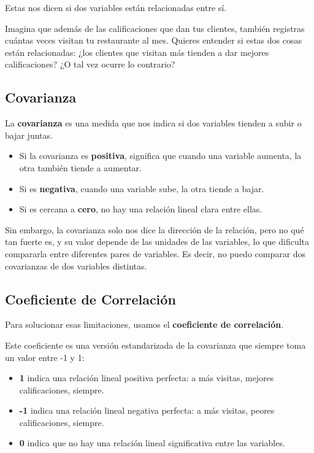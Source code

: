 \documentclass[
  spanish,
  letterpaper,
  DIV=11,
  numbers=noendperiod]{scrreprt}
\providecommand{\tightlist}{%
  \setlength{\itemsep}{0pt}\setlength{\parskip}{0pt}}
\begin{document}
Estas nos dicen si dos variables están relacionadas entre sí.

Imagina que además de las calificaciones que dan tus clientes, también
registras cuántas veces visitan tu restaurante al mes. Quieres entender
si estas dos cosas están relacionadas: ¿los clientes que visitan más
tienden a dar mejores calificaciones? ¿O tal vez ocurre lo contrario?

\subsection{Covarianza}\label{covarianza}

La \textbf{covarianza} es una medida que nos indica si dos variables
tienden a subir o bajar juntas.

\begin{itemize}
\tightlist
\item
  Si la covarianza es \textbf{positiva}, significa que cuando una
  variable aumenta, la otra también tiende a aumentar.\\
\item
  Si es \textbf{negativa}, cuando una variable sube, la otra tiende a
  bajar.\\
\item
  Si es cercana a \textbf{cero}, no hay una relación lineal clara entre
  ellas.
\end{itemize}

Sin embargo, la covarianza solo nos dice la dirección de la relación,
pero no qué tan fuerte es, y su valor depende de las unidades de las
variables, lo que dificulta compararla entre diferentes pares de
variables. Es decir, no puedo comparar dos covarianzas de dos variables
distintas.

\subsection{Coeficiente de
Correlación}\label{coeficiente-de-correlaciuxf3n}

Para solucionar esas limitaciones, usamos el \textbf{coeficiente de
correlación}.

Este coeficiente es una versión estandarizada de la covarianza que
siempre toma un valor entre -1 y 1:

\begin{itemize}
\tightlist
\item
  \textbf{1} indica una relación lineal positiva perfecta: a más
  visitas, mejores calificaciones, siempre.\\
\item
  \textbf{-1} indica una relación lineal negativa perfecta: a más
  visitas, peores calificaciones, siempre.\\
\item
  \textbf{0} indica que no hay una relación lineal significativa entre
  las variables.
\end{itemize}
\end{document}
